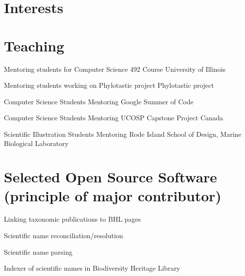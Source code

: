 \documentclass[11pt,letterpaper,sans]{moderncv} %
\begin{document}

\section{Interests}

\renewcommand{\listitemsymbol}{-~} %


\section{Teaching}

{Mentoring students for Computer Science 492 Course}
{University of Illinois}

{Mentoring students working on Phylotastic project}
{Phylotastic project}

{Computer Science Students Mentoring}
{Google Summer of Code}

{Computer Science Students Mentoring}
{UCOSP Capstone Project Canada}

{Scientific Illustration Students Mentoring}
{Rode Island School of Design, Marine Biological Laboratory}

\section{Selected Open Source Software (principle of major contributor)}

{}{Linking taxonomic publications to BHL pages}

{}{Scientific name reconciliation/resolution}

{}{Scientific name parsing}

{}{Indexer of scientific names in Biodiversity Heritage Library}
\end{document}
